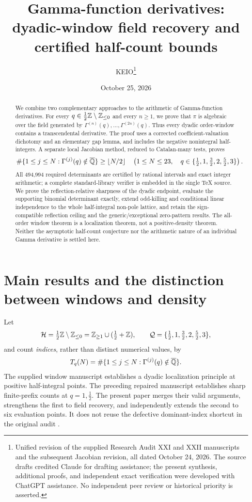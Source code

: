 \documentclass[11pt,a4paper]{article}
\title{Gamma-function derivatives:\\dyadic-window field recovery and\\certified half-count bounds}
\author{KEIO\thanks{Unified revision of the supplied Research Audit XXI and XXII manuscripts and the subsequent Jacobian revision, all dated October 24, 2026. The source drafts credited Claude for drafting assistance; the present synthesis, additional proofs, and independent exact verification were developed with ChatGPT assistance. No independent peer review or historical priority is asserted.}}
\date{October 25, 2026}
\theoremstyle{definition}\newtheorem{definition}[theorem]{Definition}
\theoremstyle{remark}\newtheorem{remark}[theorem]{Remark}
\begin{document}
\maketitle
\begin{abstract}
We combine two complementary approaches to the arithmetic of Gamma-function derivatives. For every $q\in\tfrac12\mathbb Z\setminus\mathbb Z_{\le0}$ and every $n\ge1$, we prove that $\pi$ is algebraic over the field generated by $\Gamma^{(n)}(q),\ldots,\Gamma^{(2n)}(q)$. Thus every dyadic order-window contains a transcendental derivative. The proof uses a corrected coefficient-valuation dichotomy and an elementary gap lemma, and includes the negative nonintegral half-integers. A separate local Jacobian method, reduced to Catalan-many tests, proves
\[
\#\{1\le j\le N:\Gamma^{(j)}(q)\notin\overline{\mathbb Q}\}\ge\lfloor N/2\rfloor
\quad\left(1\le N\le23,\quad q\in\{\tfrac12,1,\tfrac32,2,\tfrac52,3\}\right).
\]
All 494,994 required determinants are certified by rational intervals and exact integer arithmetic; a complete standard-library verifier is embedded in the single TeX source. We prove the reflection-relative sharpness of the dyadic endpoint, evaluate the supporting binomial determinant exactly, extend odd-killing and conditional linear independence to the whole half-integral non-pole lattice, and retain the sign-compatible reflection ceiling and the generic/exceptional zero-pattern results. The all-order window theorem is a localization theorem, not a positive-density theorem. Neither the asymptotic half-count conjecture nor the arithmetic nature of an individual Gamma derivative is settled here.
\end{abstract}

\section{Main results and the distinction between windows and density}\label{sec:intro}
Let
\[
\mathcal H=\tfrac12\mathbb Z\setminus\mathbb Z_{\le0}
 =\mathbb Z_{\ge1}\cup(\tfrac12+\mathbb Z),\qquad
\mathcal Q=\{\tfrac12,1,\tfrac32,2,\tfrac52,3\},
\]
and count \emph{indices}, rather than distinct numerical values, by
\[
T_q(N)=\#\{1\le j\le N:\Gamma^{(j)}(q)\notin\overline{\mathbb Q}\}.
\]
The supplied window manuscript \cite{Window} establishes a dyadic localization principle at positive half-integral points. The preceding repaired manuscript \cite{Revision} establishes sharp finite-prefix counts at $q=1,\tfrac12$. The present paper merges their valid arguments, strengthens the first to field recovery, and independently extends the second to six evaluation points. It does not reuse the defective dominant-index shortcut in the original audit \cite{Earlier}.
\end{document}
